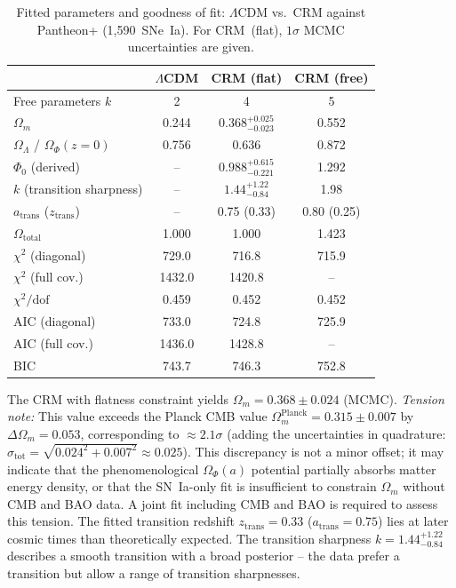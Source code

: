 \documentclass[aps,prd,twocolumn,superscriptaddress,nofootinbib]{revtex4-2}
\begin{document}
\begin{table}[htbp]
\centering
\caption{Fitted parameters and goodness of fit: $\Lambda$CDM vs.\ CRM against Pantheon+ (1,590~SNe~Ia). For CRM~(flat), $1\sigma$ MCMC uncertainties are given.}
\label{tab:results}
\begin{tabular}{lccc}
\toprule
 & $\Lambda$CDM & CRM (flat) & CRM (free) \\
\midrule
Free parameters $k$ & 2 & 4 & 5 \\
$\Omega_m$ & 0.244 & $0.368^{+0.025}_{-0.023}$ & 0.552 \\
$\Omega_\Lambda$ / $\Omega_\Phi(z{=}0)$ & 0.756 & 0.636 & 0.872 \\
$\Phi_0$ (derived) & -- & $0.988^{+0.615}_{-0.221}$ & 1.292 \\
$k$ (transition sharpness) & -- & $1.44^{+1.22}_{-0.84}$ & 1.98 \\
$a_{\mathrm{trans}}$ ($z_{\mathrm{trans}}$) & -- & 0.75 (0.33) & 0.80 (0.25) \\
$\Omega_{\mathrm{total}}$ & 1.000 & 1.000 & 1.423 \\
\midrule
$\chi^2$ (diagonal) & 729.0 & 716.8 & 715.9 \\
$\chi^2$ (full cov.) & 1432.0 & 1420.8 & -- \\
$\chi^2/\mathrm{dof}$ & 0.459 & 0.452 & 0.452 \\
AIC (diagonal) & 733.0 & 724.8 & 725.9 \\
AIC (full cov.) & 1436.0 & 1428.8 & -- \\
BIC & 743.7 & 746.3 & 752.8 \\
\bottomrule
\end{tabular}
\end{table}

The CRM with flatness constraint yields $\Omega_m = 0.368 \pm 0.024$ (MCMC). \textit{Tension note:} This value exceeds the Planck CMB value $\Omega_m^{\mathrm{Planck}} = 0.315 \pm 0.007$ by $\Delta\Omega_m = 0.053$, corresponding to $\approx 2.1\sigma$ (adding the uncertainties in quadrature: $\sigma_{\mathrm{tot}} = \sqrt{0.024^2 + 0.007^2} \approx 0.025$). This discrepancy is not a minor offset; it may indicate that the phenomenological $\Omega_\Phi(a)$ potential partially absorbs matter energy density, or that the SN~Ia-only fit is insufficient to constrain $\Omega_m$ without CMB and BAO data. A joint fit including CMB and BAO is required to assess this tension. The fitted transition redshift $z_{\mathrm{trans}} = 0.33$ ($a_{\mathrm{trans}} = 0.75$) lies at later cosmic times than theoretically expected. The transition sharpness $k = 1.44^{+1.22}_{-0.84}$ describes a smooth transition with a broad posterior -- the data prefer a transition but allow a range of transition sharpnesses.
\end{document}
